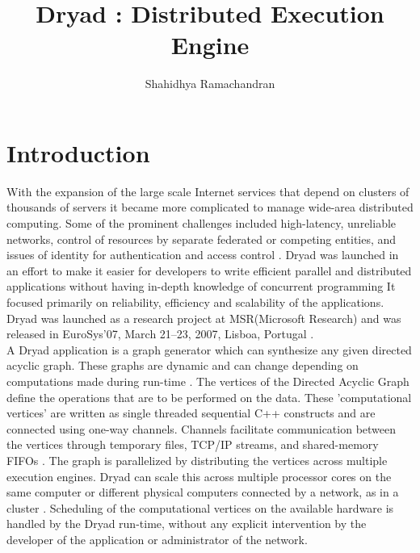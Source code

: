 \documentclass[9pt,twocolumn,twoside]{../../styles/osajnl}
\title{Dryad : Distributed Execution Engine}
\author[1]{Shahidhya Ramachandran}
\affil[1]{School of Informatics and Computing, Bloomington, IN 47408, U.S.A.}
\affil[*]{Corresponding authors: shahrama@iu.edu}
\begin{document}
\maketitle





\section{Introduction}
With the expansion of the large scale Internet services that depend on
clusters of thousands of servers it became more complicated to manage
wide-area distributed computing. Some of the prominent challenges
included high-latency, unreliable networks, control of resources by
separate federated or competing entities, and issues of identity for
authentication and access control \cite{DryadMSR1}. Dryad was launched
in an effort to make it easier for developers to write efficient
parallel and distributed applications without having in-depth
knowledge of concurrent programming \cite{www-Dryad1} It focused
primarily on reliability, efficiency and scalability of the
applications.
Dryad was launched as a research project at MSR(Microsoft Research)
and was released in EuroSys’07, March 21–23, 2007, Lisboa, Portugal
\cite{DryadMSR}.\\ A Dryad application is a graph generator which can
synthesize any given directed acyclic graph. These graphs are dynamic
and can change depending on computations made during run-time
\cite{www-Dryad1}. The vertices of the Directed Acyclic Graph define
the operations that are to be performed on the data. These
'computational vertices' are written as single threaded sequential C++
constructs and are connected using one-way channels. Channels
facilitate communication between the vertices through temporary files,
TCP/IP streams, and shared-memory FIFOs \cite{DryadMSR1}. The graph is
parallelized by distributing the vertices across multiple execution
engines. Dryad can scale this across multiple processor cores on the
same computer or different physical computers connected by a network,
as in a cluster \cite{DryadMSR1}. Scheduling of the computational
vertices on the available hardware is handled by the Dryad run-time,
without any explicit intervention by the developer of the application
or administrator of the network.
\end{document}
